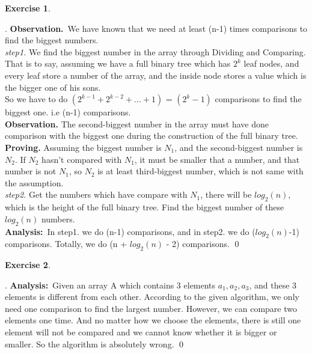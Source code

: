 \documentclass[12pt, notitlepage]{article}
\newtheorem{ex}{Exercise}
\newenvironment{sol}
  {\par\vspace{3mm}\noindent{\it Solution}.}{\qed}
\begin{document}
\begin{ex}\end{ex}
\begin{sol}
	\textbf{Observation.}~We have known that we need at least (n-1) times comparisons to find the biggest numbers.\\
	
	\emph{step1.} We find the biggest number in the array through Dividing and Comparing. That is to say, assuming we have a full binary tree which has $2^k$ leaf nodes, and every leaf store a number of the array, and the inside node stores a value which is the bigger one of his sons.\\
	So we have to do $(2^{k-1}+2^{k-2}+...+1)$ = $(2^k-1)$ comparisons to find the biggest one. i.e (n-1) comparisons.\\
	
	\textbf{Observation.} The second-biggest number in the array must have done comparison with the biggest one during the construction of the full binary tree.\\
	\textbf{Proving.} Assuming the biggest number is $N_1$, and the second-biggest number is $N_2$. If $N_2$ hasn't compared with $N_1$, it must be smaller that a number, and that number is not $N_1$, so $N_2$ is at least third-biggest number, which is not same with the assumption.\\
	
	\emph{step2.} Get the numbers which have compare with $N_1$, there will be $log_2(n)$, which is the height of the full binary tree. Find the biggest number of these $log_2(n)$ numbers.\\
	
	\textbf{Analysis:}~In step1. we do (n-1) comparisons, and in step2. we do ($log_2(n)$-1) comparisons. Totally, we do (n + $log_2(n)$ - 2) comparisons.
\end{sol}


\begin{ex}\end{ex}
\begin{sol}
	\textbf{Analysis:}~Given an array A which contains 3 elements $a_1,a_2,a_3$, and these 3 elements is different from each other. According to the given algorithm, we only need one comparison to find the largest number. However, we can compare two elements one time. And no matter how we choose the elements, there is still one element will not be compared and we cannot know whether it is bigger or smaller. So the algorithm is absolutely wrong.
\end{sol}
\end{document}
